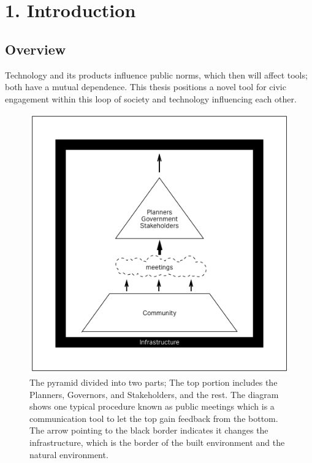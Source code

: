 \chapter{1. Introduction}

\section{Overview}

Technology and its products influence public norms, which then will affect tools; both have a mutual dependence. This thesis positions a novel tool for civic engagement within this loop of society and technology influencing each other. 

\begin{figure}[!htb]
 	\includegraphics[width=\textwidth]{chapters/1/fig/hearings.png}               
 	 \caption[diagram: community hearings]{The pyramid divided into two parts; The top portion includes the Planners, Governors, and Stakeholders, and the rest. The diagram shows one typical procedure known as public meetings which is a communication tool to let the top gain feedback from the bottom. The arrow pointing to the black border indicates it changes the infrastructure, which is the border of the built environment and the natural environment.
}
  	\label{fig:hearings}
\end{figure}

